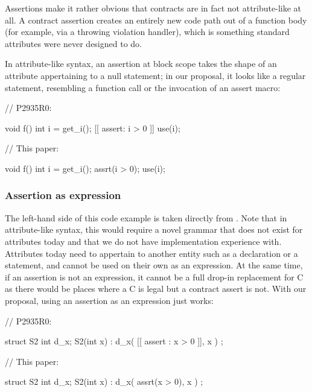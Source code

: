 Assertions make it rather obvious that contracts are in fact not attribute-like at all. A contract assertion creates an entirely new code path out of a function body (for example, via a throwing violation handler), which is something standard attributes were never designed to do. 

In attribute-like syntax, an assertion at block scope takes the shape of an attribute appertaining to a null statement; in our proposal, it looks like a regular statement, resembling a function call or the invocation of an assert macro:
\vspace{5mm}

\begin{minipage}{8cm}
\begin{codeblock}
// P2935R0:

void f() {
  int i = get_i();
  [[ assert: i > 0 ]]
  use(i);
}
\end{codeblock}
\end{minipage}
\begin{minipage}{8cm}
\begin{codeblock}
// This paper:

void f() {
  int i = get_i();
  assrt(i > 0);
  use(i);
}
\end{codeblock}
\end{minipage}

\subsubsection{Assertion as expression}

The left-hand side of this code example is taken directly from \cite{P2935R0}. Note that in attribute-like syntax, this would require a novel grammar that does not exist for attributes today and that we do not have implementation experience with. Attributes today need to appertain to another entity such as a declaration or a statement, and cannot be used on their own as an expression. At the same time, if an assertion is not an expression, it cannot be a full drop-in replacement for C  as there would be places where a C  is legal but a contract assert is not. With our proposal, using an assertion as an expression just works:
\vspace{5mm}

\begin{minipage}{8cm}
\begin{codeblock}
// P2935R0:

struct S2 {
  int d_x;
  S2(int x)
    : d_x( [[ assert : x > 0 ]], x )
  {}
};
\end{codeblock}
\end{minipage}
\begin{minipage}{8cm}
\begin{codeblock}
// This paper:

struct S2 {
  int d_x;
  S2(int x)
    : d_x( assrt(x > 0), x )
  {}
};
\end{codeblock}
\end{minipage}


